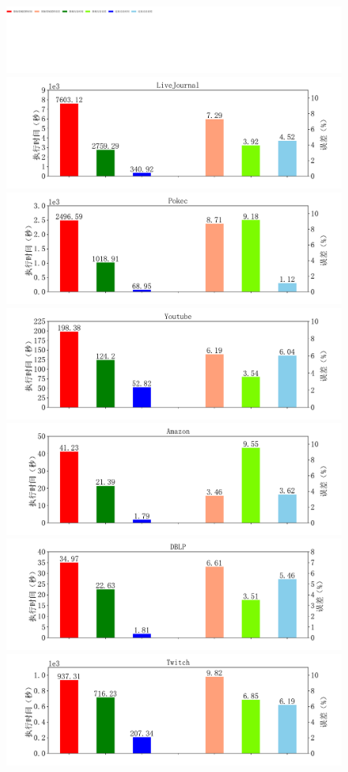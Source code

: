 \documentclass[master]{thesis-uestc}
\begin{document}
\begin{figure}
    \includegraphics[width=0.8\linewidth]{pic/fit-cmp-asap/legend.pdf}\\
    \includegraphics[width=0.5\linewidth]{pic/fit-cmp-asap/LiveJournal.pdf}%
    \includegraphics[width=0.5\linewidth]{pic/fit-cmp-asap/Pokec.pdf}\\
    \includegraphics[width=0.5\linewidth]{pic/fit-cmp-asap/Youtube.pdf}%
    \includegraphics[width=0.5\linewidth]{pic/fit-cmp-asap/Amazon.pdf}\\
    \includegraphics[width=0.5\linewidth]{pic/fit-cmp-asap/DBLP.pdf}%
    \includegraphics[width=0.5\linewidth]{pic/fit-cmp-asap/Twitch.pdf}\\

\end{figure}
\end{document}
